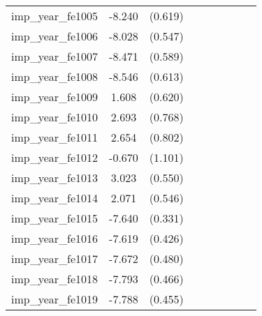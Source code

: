 {\begin{tabular}{l*{4}{cc}}
imp\_year\_fe1005&   -8.240\sym{***}&  (0.619)&                  &         &                  &         &                  &         \\
imp\_year\_fe1006&   -8.028\sym{***}&  (0.547)&                  &         &                  &         &                  &         \\
imp\_year\_fe1007&   -8.471\sym{***}&  (0.589)&                  &         &                  &         &                  &         \\
imp\_year\_fe1008&   -8.546\sym{***}&  (0.613)&                  &         &                  &         &                  &         \\
imp\_year\_fe1009&    1.608\sym{**} &  (0.620)&                  &         &                  &         &                  &         \\
imp\_year\_fe1010&    2.693\sym{***}&  (0.768)&                  &         &                  &         &                  &         \\
imp\_year\_fe1011&    2.654\sym{***}&  (0.802)&                  &         &                  &         &                  &         \\
imp\_year\_fe1012&   -0.670         &  (1.101)&                  &         &                  &         &                  &         \\
imp\_year\_fe1013&    3.023\sym{***}&  (0.550)&                  &         &                  &         &                  &         \\
imp\_year\_fe1014&    2.071\sym{***}&  (0.546)&                  &         &                  &         &                  &         \\
imp\_year\_fe1015&   -7.640\sym{***}&  (0.331)&                  &         &                  &         &                  &         \\
imp\_year\_fe1016&   -7.619\sym{***}&  (0.426)&                  &         &                  &         &                  &         \\
imp\_year\_fe1017&   -7.672\sym{***}&  (0.480)&                  &         &                  &         &                  &         \\
imp\_year\_fe1018&   -7.793\sym{***}&  (0.466)&                  &         &                  &         &                  &         \\
imp\_year\_fe1019&   -7.788\sym{***}&  (0.455)&                  &         &                  &         &                  &         \\

\end{tabular}}
